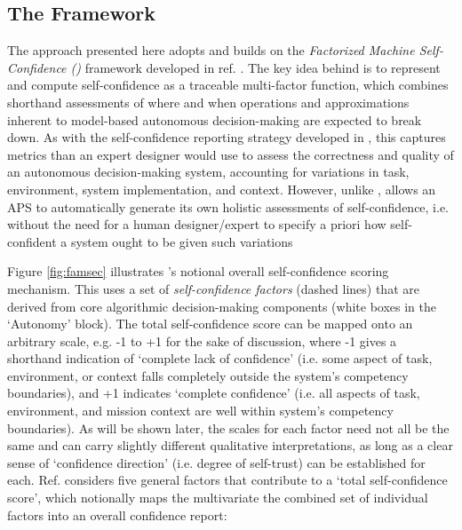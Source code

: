     \subsection{The \famsec{} Framework }
    The approach presented here adopts and builds on the \emph{Factorized Machine Self-Confidence (\famsec)} framework developed in ref. \cite{Aitken2016-cv, Aitken2016-fb}. The key idea behind \famsec{} is to represent and compute self-confidence as a traceable multi-factor function, which combines shorthand assessments of where and when operations and approximations inherent to model-based autonomous decision-making are expected to break down. As with the self-confidence reporting strategy developed in \cite{Hutchins2015-if}, this captures metrics than an expert designer would use to assess the correctness and quality of an autonomous decision-making system, accounting for variations in task, environment, system implementation, and context. However, unlike \cite{Hutchins2015-if}, \famsec{} allows an APS to automatically generate its own holistic assessments of self-confidence, i.e. without the need for a human designer/expert to specify a priori how self-confident a system ought to be given such variations %
    
    Figure \ref{fig:famsec} illustrates \famsec's notional overall self-confidence scoring mechanism. This uses a set of \emph{self-confidence factors} (dashed lines) that are derived from core algorithmic decision-making components (white boxes in the `Autonomy' block). The total self-confidence score can be mapped onto an arbitrary scale, e.g. -1 to +1 for the sake of discussion, where -1 gives a shorthand indication of `complete lack of confidence' (i.e. some aspect of task, environment, or context falls completely outside the system's competency boundaries), and +1 indicates `complete confidence' (i.e. all aspects of task, environment, and mission context are well within system's competency boundaries). As will be shown later, the scales for each factor need not all be the same and can carry slightly different qualitative interpretations, as long as a clear sense of `confidence direction' (i.e. degree of self-trust) can be established for each. 
    Ref. \cite{Aitken2016-cv} considers five general factors that contribute to a `total self-confidence score', which notionally maps the multivariate the combined set of individual factors into an overall confidence report:
    
